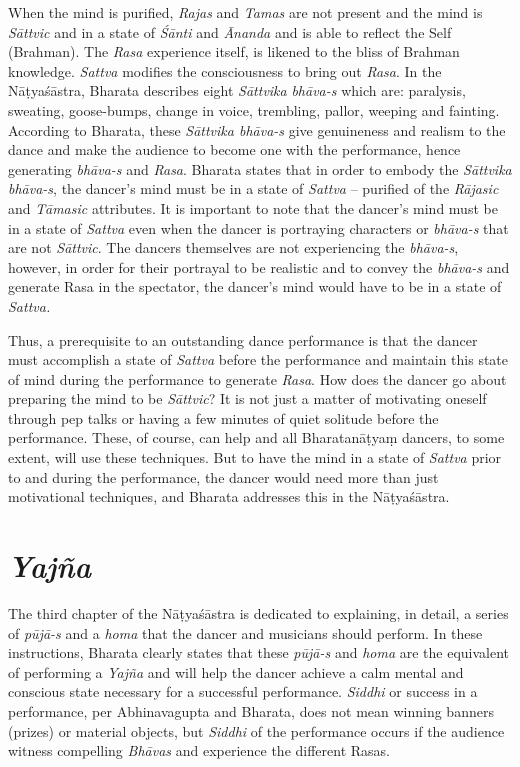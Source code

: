 When the mind is purified, \textit{Rajas }and \textit{Tamas} are not present and the mind is \textit{Sāttvic} and in a state of \textit{Śānti} and\textit{ Ānanda }and is able to reflect the Self (Brahman). The \textit{Rasa} experience itself, is likened to the bliss of Brahman knowledge. \textit{Sattva} modifies the consciousness to bring out \textit{Rasa}. In the Nāṭyaśāstra, Bharata describes eight \textit{Sāttvika} \textit{bhāva-s} which are: paralysis, sweating, goose-bumps, change in voice, trembling, pallor, weeping and fainting. According to Bharata, these \textit{Sāttvika bhāva-s} give genuineness and realism to the dance and make the audience to become one with the performance, hence generating \textit{bhāva-s} and \textit{Rasa}. Bharata states that in order to embody the \textit{Sāttvika bhāva-s}, the dancer’s mind must be in a state of \textit{Sattva} – purified of the \textit{Rājasic} and \textit{Tāmasic} attributes. It is important to note that the dancer’s mind must be in a state of \textit{Sattva} even when the dancer is portraying characters or \textit{bhāva-s} that are not \textit{Sāttvic}. The dancers themselves are not experiencing the \textit{bhāva-s}, however, in order for their portrayal to be realistic and to convey the \textit{bhāva-s} and generate Rasa in the spectator, the dancer’s mind would have to be in a state of \textit{Sattva.}

Thus, a prerequisite to an outstanding dance performance is that the dancer must accomplish a state of \textit{Sattva} before the performance and maintain this state of mind during the performance to generate \textit{Rasa}. How does the dancer go about preparing the mind to be \textit{Sāttvic}? It is not just a matter of motivating oneself through pep talks or having a few minutes of quiet solitude before the performance. These, of course, can help and all Bharatanāṭyaṃ dancers, to some extent, will use these techniques. But to have the mind in a state of \textit{Sattva} prior to and during the performance, the dancer would need more than just motivational techniques, and Bharata addresses this in the Nāṭyaśāstra.


\section*{\textit{Yajña}}

The third chapter of the Nāṭyaśāstra is dedicated to explaining, in detail, a series of \textit{pūjā-s} and a \textit{homa} that the dancer and musicians should perform. In these instructions, Bharata clearly states that these \textit{pūjā-s} and \textit{homa} are the equivalent of performing a \textit{Yajña} and will help the dancer achieve a calm mental and conscious state necessary for a successful performance. \textit{Siddhi} or success in a performance, per Abhinavagupta and Bharata, does not mean winning banners (prizes) or material objects, but \textit{Siddhi} of the performance occurs if the audience witness compelling \textit{Bhāvas} and experience the different Rasas. 

